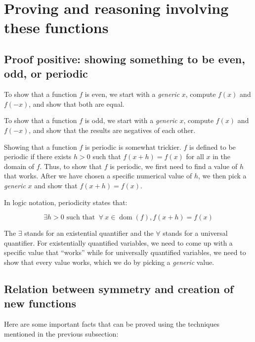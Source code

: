 \documentclass{amsart}
\begin{document}
\section{Proving and reasoning involving these functions}

\subsection{Proof positive: showing something to be even, odd, or periodic}

To show that a function $f$ is even, we start with a {\em generic}
$x$, compute $f(x)$ and $f(-x)$, and show that both are equal.

To show that a function $f$ is odd, we start with a {\em generic} $x$,
compute $f(x)$ and $f(-x)$, and show that the results are negatives of
each other.

Showing that a function $f$ is periodic is somewhat trickier. $f$ is
defined to be periodic if there exists $h > 0$ such that $f(x + h) =
f(x)$ for all $x$ in the domain of $f$. Thus, to show that $f$ is
periodic, we first need to find a value of $h$ that works. After we
have chosen a specific numerical value of $h$, we then pick a {\em
generic} $x$ and show that $f(x + h) = f(x)$.

In logic notation, periodicity states that:

\begin{equation*}
  \exists h > 0 \text{ such that } \ \forall \ x \in
  \operatorname{dom}(f), f(x + h) = f(x)
\end{equation*}

The $\exists$ stands for an existential quantifier and the $\forall$
stands for a universal quantifier. For existentially quantified
variables, we need to come up with a specific value that ``works''
while for universally quantified variables, we need to show that every
value works, which we do by picking a {\em generic} value.

\subsection{Relation between symmetry and creation of new functions}

Here are some important facts that can be proved using the techniques
mentioned in the previous subsection:
\end{document}
